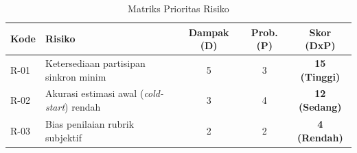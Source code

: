 \begin{table}[H]
    \centering
    \caption{Matriks Prioritas Risiko}
    \label{tbl:matriks_risiko}
    \begin{tabular}{|l|p{}|c|c|c|}
        \hline
        \textbf{Kode} & \textbf{Risiko} & \textbf{Dampak (D)} & \textbf{Prob. (P)} & \textbf{Skor (DxP)} \\
        \hline
        R-01 & Ketersediaan partisipan sinkron minim & 5 & 3 & \textbf{15 (Tinggi)} \\
        \hline
        R-02 & Akurasi estimasi awal (\textit{cold-start}) rendah & 3 & 4 & \textbf{12 (Sedang)} \\
        \hline
        R-03 & Bias penilaian rubrik subjektif & 2 & 2 & \textbf{4 (Rendah)} \\
        \hline
    \end{tabular}
\end{table}